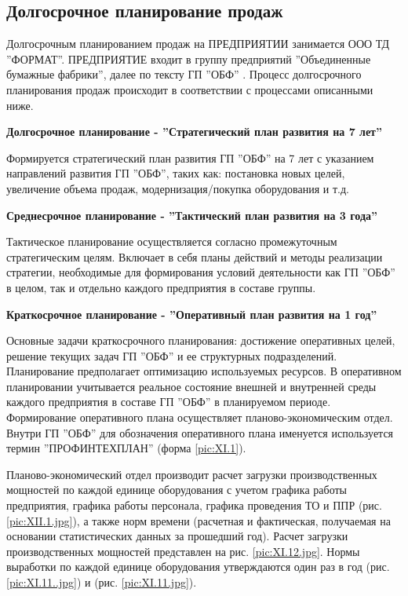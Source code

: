 \newpage
\subsection{Долгосрочное планирование продаж}
\label{bp:monthplan}


Долгосрочным планированием продаж на ПРЕДПРИЯТИИ занимается ООО ТД ''ФОРМАТ''. %
ПРЕДПРИЯТИЕ входит в группу предприятий ''Объединенные бумажные фабрики'', далее по тексту ГП ''ОБФ'' .
Процесс долгосрочного планирования продаж происходит в соответствии с процессами описанными ниже.


  \textbf{Долгосрочное планирование - ''Стратегический план развития на 7 лет''}
    
Формируется стратегический план развития ГП ''ОБФ'' на 7 лет с указанием направлений развития ГП ''ОБФ'', таких как:  постановка новых целей, увеличение объема продаж, модернизация/покупка оборудования и т.д.

  \textbf{Среднесрочное планирование - ''Тактический план развития на 3 года''}
    
Тактическое планирование осуществляется согласно промежуточным стратегическим целям. Включает в себя планы действий и методы реализации стратегии, необходимые для формирования условий деятельности как ГП ''ОБФ'' в целом, так и отдельно каждого предприятия в составе группы.

\textbf{Краткосрочное планирование - ''Оперативный план развития на 1 год''}

Основные задачи краткосрочного планирования: достижение оперативных целей, решение текущих задач ГП ''ОБФ'' и ее структурных подразделений. Планирование предполагает оптимизацию используемых ресурсов. В оперативном планировании учитывается реальное состояние внешней и внутренней среды каждого предприятия в составе ГП ''ОБФ'' в планируемом периоде.
Формирование оперативного плана осуществляет планово-экономическим отдел.  
Внутри ГП ''ОБФ'' для обозначения оперативного плана именуется используется термин ''ПРОФИНТЕХПЛАН'' (форма \ref{pic:XI.1}).

Планово-экономический отдел производит расчет загрузки производственных мощностей по каждой единице оборудования с учетом графика работы предприятия, графика работы персонала, графика проведения ТО и ППР (рис. \ref{pic:XII.1.jpg}), а также норм времени (расчетная и фактическая, получаемая на основании статистических данных за прошедший год). Расчет загрузки производственных мощностей представлен на рис. \ref{pic:XI.12.jpg}.
Нормы выработки по каждой единице оборудования утверждаются один раз в год (рис. \ref{pic:XI.11..jpg}) и (рис. \ref{pic:XI.11.jpg}).

